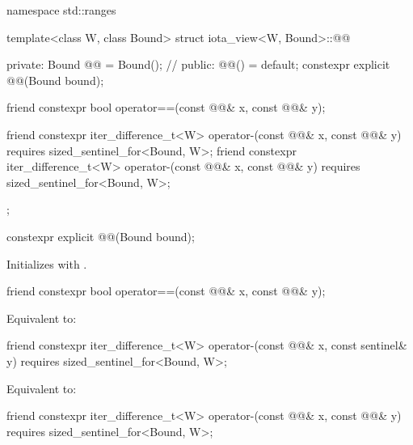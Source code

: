 %
\begin{codeblock}
namespace std::ranges {
  template<class W, class Bound>
  struct iota_view<W, Bound>::@@ {
  private:
    Bound @@ = Bound();     // \expos
  public:
    @@() = default;
    constexpr explicit @@(Bound bound);

    friend constexpr bool operator==(const @@& x, const @@& y);

    friend constexpr iter_difference_t<W> operator-(const @@& x, const @@& y)
      requires sized_sentinel_for<Bound, W>;
    friend constexpr iter_difference_t<W> operator-(const @@& x, const @@& y)
      requires sized_sentinel_for<Bound, W>;
  };
}
\end{codeblock}

\begin{itemdecl}
constexpr explicit @@(Bound bound);
\end{itemdecl}

\begin{itemdescr}
\pnum
\effects
Initializes  with .
\end{itemdescr}

\begin{itemdecl}
friend constexpr bool operator==(const @@& x, const @@& y);
\end{itemdecl}

\begin{itemdescr}
\pnum
\effects
Equivalent to: 
\end{itemdescr}

\begin{itemdecl}
friend constexpr iter_difference_t<W> operator-(const @@& x, const sentinel& y)
  requires sized_sentinel_for<Bound, W>;
\end{itemdecl}

\begin{itemdescr}
\pnum
\effects
Equivalent to: 
\end{itemdescr}

\begin{itemdecl}
friend constexpr iter_difference_t<W> operator-(const @@& x, const @@& y)
  requires sized_sentinel_for<Bound, W>;
\end{itemdecl}

